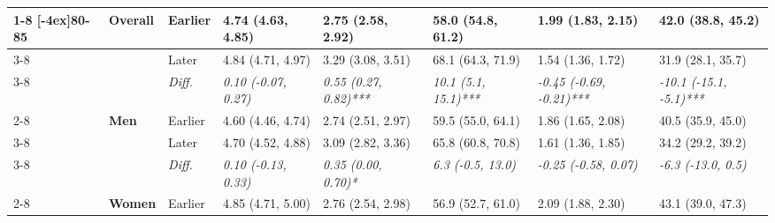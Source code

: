 \documentclass[12pt, a4paper]{article}
\begin{document}
\begin{appendices}
\begin{table}[!p]
{\begin{tabular}[t]{>{}l>{}lllllll}
        \cmidrule{1-8}
        \multirow{9}{*}[-4ex]{\textbf{80-85}} & \multirow{3}{*}{\textbf{Overall}} & Earlier                       & 4.74 (4.63, 4.85)                           & 2.75 (2.58, 2.92)                            & 58.0 (54.8, 61.2)                           & 1.99 (1.83, 2.15)                               & 42.0 (38.8, 45.2)                              \\
        \cmidrule{3-8}
                                              &                                   & Later                         & 4.84 (4.71, 4.97)                           & 3.29 (3.08, 3.51)                            & 68.1 (64.3, 71.9)                           & 1.54 (1.36, 1.72)                               & 31.9 (28.1, 35.7)                              \\
        \cmidrule{3-8}
                                              &                                   & \cellcolor{gray!10}\em{Diff.} & \cellcolor{gray!10}\em{0.10 (-0.07, 0.27)}  & \cellcolor{gray!10}\em{0.55 (0.27, 0.82)***} & \cellcolor{gray!10}\em{10.1 (5.1, 15.1)***} & \cellcolor{gray!10}\em{-0.45 (-0.69, -0.21)***} & \cellcolor{gray!10}\em{-10.1 (-15.1, -5.1)***} \\
        \cmidrule{2-8}
                                              & \multirow{3}{*}{\textbf{Men}}     & Earlier                       & 4.60 (4.46, 4.74)                           & 2.74 (2.51, 2.97)                            & 59.5 (55.0, 64.1)                           & 1.86 (1.65, 2.08)                               & 40.5 (35.9, 45.0)                              \\
        \cmidrule{3-8}
                                              &                                   & Later                         & 4.70 (4.52, 4.88)                           & 3.09 (2.82, 3.36)                            & 65.8 (60.8, 70.8)                           & 1.61 (1.36, 1.85)                               & 34.2 (29.2, 39.2)                              \\
        \cmidrule{3-8}
                                              &                                   & \cellcolor{gray!10}\em{Diff.} & \cellcolor{gray!10}\em{0.10 (-0.13, 0.33)}  & \cellcolor{gray!10}\em{0.35 (0.00, 0.70)*}   & \cellcolor{gray!10}\em{6.3 (-0.5, 13.0)}    & \cellcolor{gray!10}\em{-0.25 (-0.58, 0.07)}     & \cellcolor{gray!10}\em{-6.3 (-13.0, 0.5)}      \\
        \cmidrule{2-8}
                                              & \multirow{3}{*}{\textbf{Women}}   & Earlier                       & 4.85 (4.71, 5.00)                           & 2.76 (2.54, 2.98)                            & 56.9 (52.7, 61.0)                           & 2.09 (1.88, 2.30)                               & 43.1 (39.0, 47.3)                              \\

\end{tabular}}
\end{table}
\end{appendices}
\end{document}
